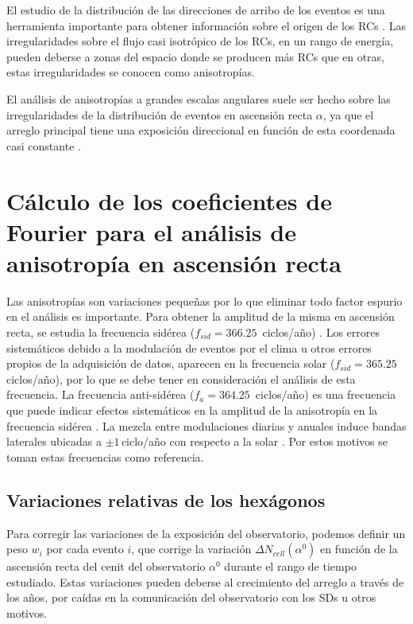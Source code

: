 El estudio de la distribución de las direcciones de arribo de los eventos es una herramienta importante para obtener información sobre el origen de los RCs . Las irregularidades sobre el flujo casi isotrópico de los RCs, en un rango de energía, pueden deberse a  zonas del espacio donde se producen más RCs que en otras, estas irregularidades se conocen como anisotropías. 

El análisis de anisotropías a grandes escalas angulares suele ser hecho sobre las irregularidades de la distribución de eventos en ascensión recta $\alpha$, ya que el arreglo principal tiene una exposición direccional en función de esta coordenada casi constante \cite{referencia_anis}.

\section{Cálculo de los coeficientes de Fourier para el análisis de anisotropía en ascensión recta}

Las anisotropías son variaciones pequeñas por lo que eliminar todo factor espurio en el análisis es importante. Para obtener la amplitud de la misma en ascensión recta, se estudia la frecuencia sidérea ($f_{sid}=366.25\,$ ciclos/año) \cite{taborda}. Los errores sistemáticos debido a la modulación de eventos por el clima u otros errores propios de la adquisición de datos, aparecen en la frecuencia solar  ($f_{sid}=365.25\,$ ciclos/año), por lo que se debe tener en consideración el análisis de esta frecuencia. La frecuencia anti-sidérea ($f_a=364.25\,$ ciclos/año) es una frecuencia que puede indicar efectos sistemáticos en la amplitud de la anisotropía en la frecuencia sidérea \cite{farley1954sidereal}. La mezcla entre modulaciones diarias y anuales induce bandas laterales ubicadas a $\pm1\,$ciclo/año con respecto a la solar \cite{taborda}. Por estos motivos se toman estas frecuencias  como referencia.

  \subsection{Variaciones relativas de los hexágonos} \label{peso_hexagonos}

Para corregir las variaciones de la exposición del observatorio, podemos definir un peso  $w_i$ por cada evento $i$, que corrige la variación  $\Delta N_{cell}(\alpha^0)$ en función de la ascensión recta del cenit del observatorio $\alpha^0$ durante el rango de tiempo estudiado. Estas variaciones pueden deberse al crecimiento del arreglo a través de los años,  por caídas en la comunicación del observatorio con los SDs u otros motivos. 

